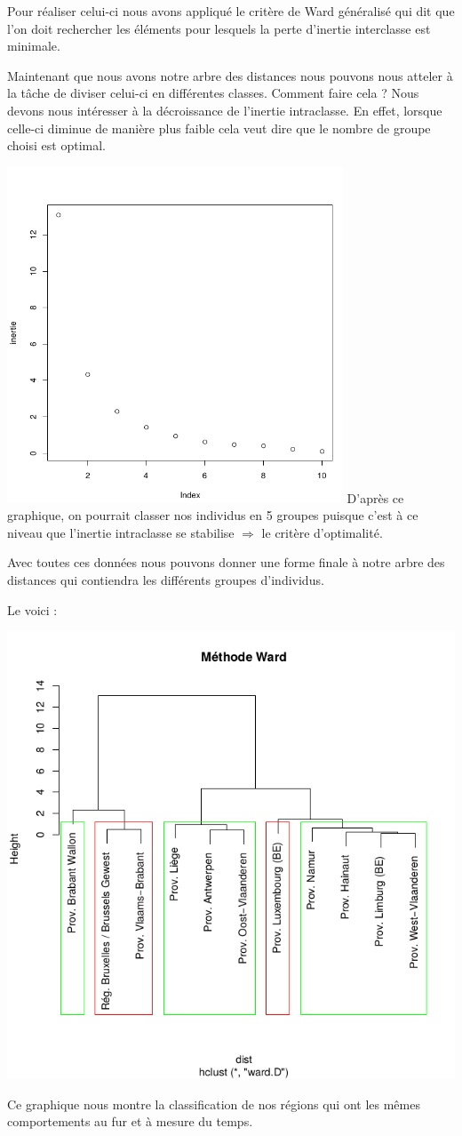 \documentclass{article}
\begin{document}
Pour réaliser celui-ci nous avons appliqué le critère de Ward généralisé qui dit que l'on doit rechercher les éléments pour lesquels la perte d'inertie interclasse est minimale.


Maintenant que nous avons notre arbre des distances nous pouvons nous atteler à la tâche de diviser celui-ci en différentes classes. Comment faire cela ? Nous devons nous intéresser à la décroissance de l'inertie intraclasse. En effet, lorsque celle-ci diminue de manière plus faible cela veut dire que le nombre de groupe choisi est optimal.

\includegraphics[width=10cm]{Inertie}
\newpage
D'après ce graphique, on pourrait classer nos individus en 5 groupes puisque c'est à ce niveau que l'inertie intraclasse se stabilise $\Rightarrow$ le critère d'optimalité.

Avec toutes ces données nous pouvons donner une forme finale à notre arbre des distances qui contiendra les différents groupes d'individus.

Le voici : 

\includegraphics[width=\textwidth]{Ward}

Ce graphique nous montre la classification de nos régions qui ont les mêmes comportements au fur et à mesure du temps.


\end{document}
